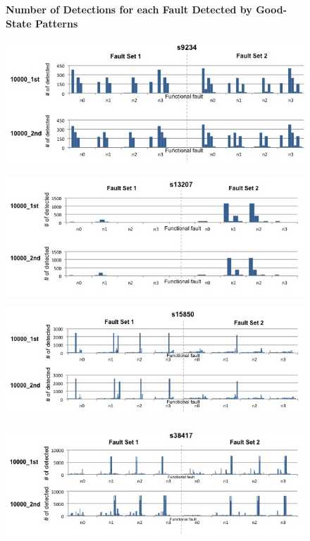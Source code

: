 \documentclass[10 pt, technote]{IEEEtran}
\begin{document}
\begin{figure}[H]
\begin{center}
\textbf{Number of Detections for each Fault Detected by Good-State Patterns}%
\end{center}
\includegraphics[scale=0.2,width = \linewidth]{../Figures/detections_s9234.jpg}
\end{figure}

\begin{figure}[H]
\includegraphics[scale=0.2,width = \linewidth]{../Figures/detections_s13207.jpg}
\end{figure}

\begin{figure}[H]
\includegraphics[scale=0.2,width = \linewidth]{../Figures/detections_s15850.jpg}
\end{figure}

\begin{figure}[H]
\includegraphics[scale=0.2,width = \linewidth]{../Figures/detections_s38417.jpg}
\end{figure}
\end{document}
